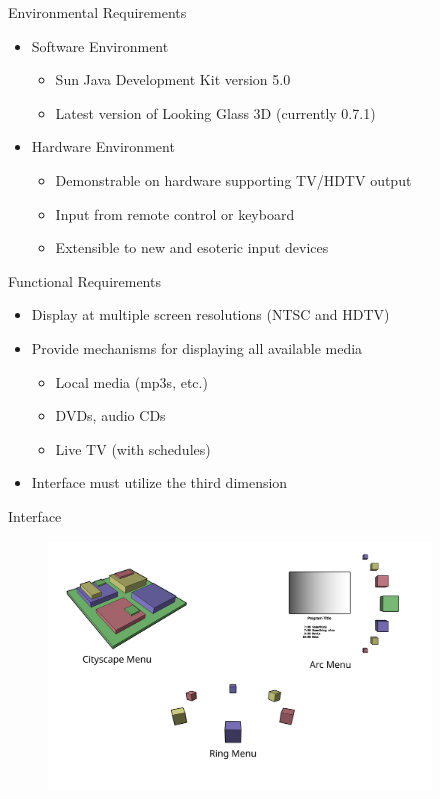 \documentclass[style=smrt,mode=present,paper=screen]{powerdot}
\begin{document}
\begin{slide}{Environmental Requirements}
\begin{itemize}
\item Software Environment
\begin{itemize}
	\item Sun Java Development Kit version 5.0
	\item Latest version of Looking Glass 3D (currently 0.7.1)
\end{itemize}
\item Hardware Environment
\begin{itemize}
	\item Demonstrable on hardware supporting TV/HDTV output
	\item Input from remote control or keyboard
	\item Extensible to new and esoteric input devices
\end{itemize}
\end{itemize}
\end{slide}

\begin{slide}{Functional Requirements}
\begin{itemize}
\item Display at multiple screen resolutions (NTSC and HDTV)
\item Provide mechanisms for displaying all available media
\begin{itemize}
	\item Local media (mp3s, etc.)
	\item DVDs, audio CDs
	\item Live TV (with schedules)
\end{itemize}
\item Interface must utilize the third dimension
\end{itemize}
\end{slide}


\begin{slide}{Interface}
\begin{figure}[htb]
	\includegraphics[angle=-90,width=4in]{figures/interface}
\end{figure}
\end{slide}
\end{document}
